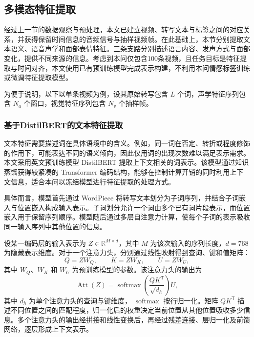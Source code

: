 
    \label{fig:video_time}


\subsection{多模态特征提取} 

经过上一节的数据观察与预处理，本文已建立视频、转写文本与标签之间的对应关系，并获得保留时间信息的音频信号与抽样视频帧。在此基础上，本节分别提取文本语义、语音声学和面部表情特征。三条支路分别描述语言内容、发声方式与面部变化，提供不同来源的信息。考虑到本问仅包含100条视频，且任务目标是特征提取与时间对齐，本文使用已有预训练模型完成表示构建，不利用本问情感标签训练或微调特征提取模型。

为便于说明，以下以单条视频为例，设其原始转写包含 $L$ 个词，声学特征序列包含 $N_a$ 个窗口，视觉特征序列包含 $N_v$ 个抽样帧。


\subsubsection{基于DistilBERT的文本特征提取}

文本特征需要描述词在具体语境中的含义。例如，同一词在否定、转折或程度修饰的作用下，可能表达不同的语义倾向，因此仅用词的出现次数难以满足表示需求。本文采用英文预训练模型 DistilBERT 提取上下文相关的词表示。该模型通过知识蒸馏获得较紧凑的 Transformer 编码结构，能够在控制计算开销的同时利用上下文信息，适合本问以冻结模型进行特征提取的处理方式。

具体而言，模型首先通过 WordPiece 将转写文本划分为子词序列，并结合子词嵌入与位置嵌入构成输入表示。子词划分允许一个词由多个已有词片段表示，而位置嵌入用于保留序列顺序。模型随后通过多层自注意力计算，使每个子词的表示吸收同一输入序列中其他位置的信息。

设某一编码层的输入表示为
$Z\in\mathbb{R}^{M\times d}$，其中 $M$ 为该次输入的序列长度，$d=768$ 为隐藏表示维度。对于一个注意力头，分别通过线性映射得到查询、键和值矩阵：
\[
    Q=ZW_Q,\qquad K=ZW_K,\qquad U=ZW_U,
\]
其中 $W_Q$、$W_K$ 和 $W_U$ 为预训练模型的参数。该注意力头的输出为
\begin{equation}
    \operatorname{Att}(Z)
    =
    \operatorname{softmax}
    \left(
        \frac{QK^{\mathsf T}}{\sqrt{d_h}}
    \right)U,
    \label{eq:p1_text_attention}
\end{equation}
其中 $d_h$ 为单个注意力头的查询与键维度，
$\operatorname{softmax}$ 按行归一化。矩阵
$QK^{\mathsf T}$ 描述不同位置之间的匹配程度，归一化后的权重决定当前位置从其他位置吸收多少信息。多个注意力头的输出经拼接和线性变换后，再经过残差连接、层归一化及前馈网络，逐层形成上下文表示。

